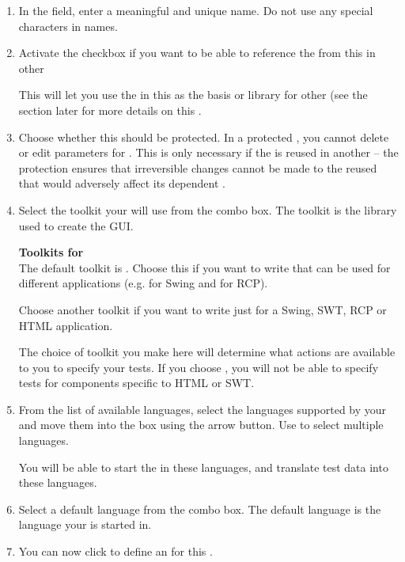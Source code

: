 \begin{enumerate}
\item In the  field, enter a meaningful and unique \gdproject{} name.
 Do not use any special characters in \gdproject{} names. 


\item Activate the  checkbox if you want to be able to reference the \gdcases{} from this \gdproject{} in other \gdprojects{} 

This will let you use  the \gdcases{} in this \gdproject{} as the basis or library for other \gdprojects{}  (see the section later for more details on this . 

\item Choose whether this \gdproject{} should be protected. In a protected \gdprojects{}, you cannot delete \gdcases{} or edit parameters for \gdcases{}. This is only necessary if the \gdproject{} is reused in another \gdproject{} -- the protection ensures that irreversible changes cannot be made to the reused \gdproject{} that would adversely affect its dependent \gdprojects{}.

\item Select the toolkit your \gdproject{} will use from the combo box. The toolkit is the library used to create the GUI. 

\textbf{Toolkits for \gdprojects{}}\\
\label{projtoolkit}
The default toolkit is . Choose this if you want to write \gdcases{} that can be used for different applications (e.g. for Swing and for RCP).

Choose another toolkit if you want to write \gdcases{} just for a Swing, SWT, RCP or HTML application. 

The choice of toolkit you make here will determine what actions are available to you to specify your tests. If you choose , you will not be able to specify tests for components specific to HTML or SWT.

\item From the list of available languages, select the languages supported by your \gdaut{} and move them into the  box using the arrow button. Use  to select multiple languages.

You will be able to start the \gdaut{} in these languages, and translate test data into these languages. 


\item Select a default language from the combo box. The default language is the language your \gdproject{} is started in. 

\item You can now click  to define an \gdaut{} for this \gdproject{} .
\end{enumerate}

